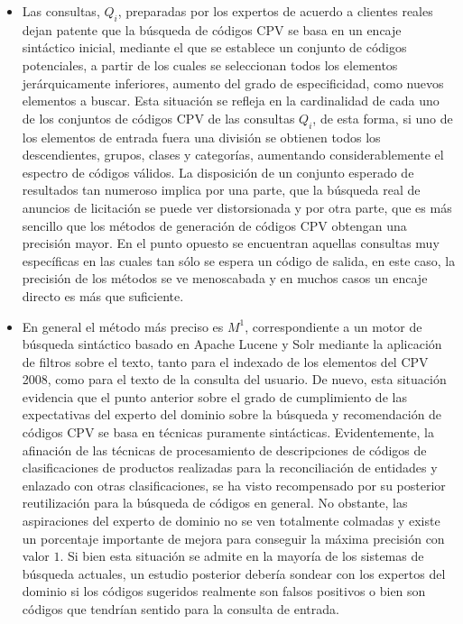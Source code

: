 \begin{itemize}
 \item Las consultas, $Q_{i}$, preparadas por los expertos de acuerdo a clientes reales dejan patente 
que la búsqueda de códigos CPV se basa en un encaje sintáctico inicial, mediante el que se 
establece un conjunto de códigos potenciales, a partir de los cuales se seleccionan todos los 
elementos jerárquicamente inferiores, aumento del grado de especificidad, como nuevos elementos 
a buscar. Esta situación se refleja en la cardinalidad de cada uno de los conjuntos de códigos 
CPV de las consultas $Q_{i}$, de esta forma, si uno de los elementos de entrada fuera una división 
se obtienen todos los descendientes, grupos, clases y categorías, aumentando considerablemente el espectro de códigos 
válidos. La disposición de un conjunto esperado de resultados tan numeroso implica por una parte, que 
la búsqueda real de anuncios de licitación se puede ver distorsionada y por otra parte, que es más sencillo 
que los métodos de generación de códigos CPV obtengan una precisión mayor. En el punto opuesto se encuentran 
aquellas consultas muy específicas en las cuales tan sólo se espera un código de salida, en este caso, la precisión 
de los métodos se ve menoscabada y en muchos casos un encaje directo es más que suficiente.

\item En general el método más preciso es $M^1$, correspondiente a un motor de búsqueda 
sintáctico basado en Apache \gls{Lucene} y \gls{Solr} mediante la aplicación de filtros sobre el texto, tanto 
para el indexado de los elementos del CPV 2008, como para el texto de la consulta del usuario. De nuevo, 
esta situación evidencia que el punto anterior sobre el grado de cumplimiento de las expectativas del experto 
del dominio sobre la búsqueda y recomendación de códigos CPV se basa en técnicas puramente sintácticas. Evidentemente, 
la afinación de las técnicas de procesamiento de descripciones de códigos de clasificaciones de productos realizadas 
para la reconciliación de entidades y enlazado con otras clasificaciones, se ha visto recompensado por su posterior 
reutilización para la búsqueda de códigos en general. No obstante, las aspiraciones del experto de dominio no se ven 
totalmente colmadas y existe un porcentaje importante de mejora para conseguir la máxima precisión con valor $1$. Si bien 
esta situación se admite en la mayoría de los sistemas de búsqueda actuales, un estudio posterior debería sondear con los 
expertos del dominio si los códigos sugeridos realmente son falsos positivos o bien son códigos que tendrían sentido 
para la consulta de entrada.


\end{itemize}
